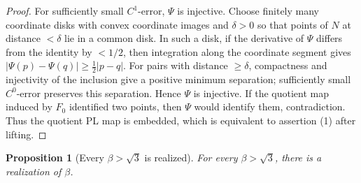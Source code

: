 \documentclass[12pt]{article}
\theoremstyle{plain}
\newtheorem{proposition}[theorem]{Proposition}
\begin{document}
\begin{proof}
For sufficiently small \(C^1\)-error, \(\Psi\) is injective.  Choose finitely
many coordinate disks with convex coordinate images and \(\delta>0\) so that
points of \(N\) at distance \(<\delta\) lie in a common disk.  In such a disk,
if the derivative of \(\Psi\) differs from the identity by \(<1/2\), then
integration along the coordinate segment gives
\(|\Psi(p)-\Psi(q)|\ge \frac12|p-q|\).  For pairs with distance \(\ge\delta\),
compactness and injectivity of the inclusion give a positive minimum
separation; sufficiently small \(C^0\)-error preserves this separation.  Hence
\(\Psi\) is injective.  If the quotient map induced by \(F_0\) identified two
points, then \(\Psi\) would identify them, contradiction.  Thus the quotient
PL map is embedded, which is equivalent to assertion (1) after lifting.
\end{proof}

\begin{proposition}[Every \(\beta>\sqrt3\) is realized]\label{prop:upper}
For every \(\beta>\sqrt3\), there is a realization of \(\beta\).
\end{proposition}
\end{document}
